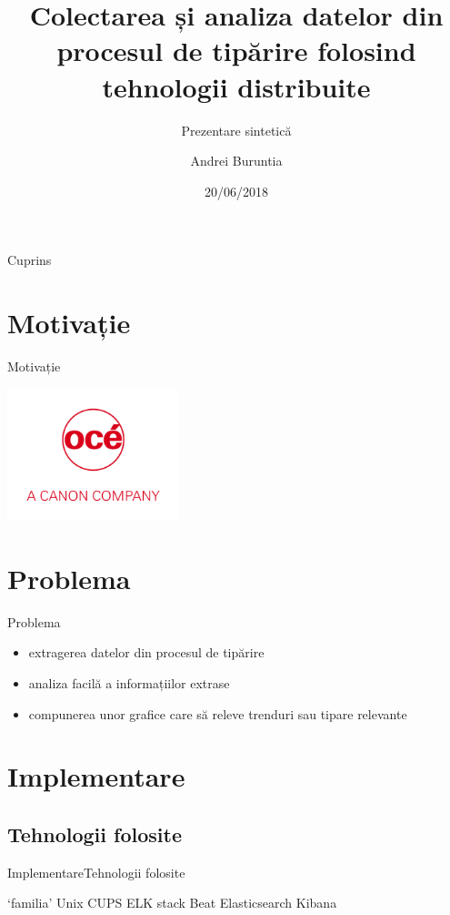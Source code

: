 \documentclass{beamer}
\title{Colectarea și analiza datelor din procesul de tipărire folosind tehnologii distribuite}
\subtitle{Prezentare sintetică}
\author{Andrei Buruntia}
\date{20/06/2018}
\begin{document}
\begin{frame}
  \titlepage
\end{frame}

\begin{frame}{Cuprins}
  \tableofcontents
\end{frame}

\section{Motivație}
\begin{frame}{Motivație}	
	\begin{center}
		\includegraphics[width=50mm]{oce_logo.png}
	\end{center}
\end{frame}
\section{Problema}
\begin{frame}{Problema}
	\begin{itemize}[<+->]
	\item extragerea datelor din procesul de tipărire
	\item analiza facilă a informațiilor extrase
	\item compunerea unor grafice care să releve trenduri sau tipare relevante
	\end{itemize}
\end{frame}
\section{Implementare}
\subsection{Tehnologii folosite}
\begin{frame}{Implementare}{Tehnologii folosite}
	\begin{outline}
 	\1 `familia' Unix
 	\1 CUPS
 	\1 ELK stack
 		\2 Beat
 		\2 Elasticsearch
 		\2 Kibana
	\end{outline}
\end{frame}
\end{document}
